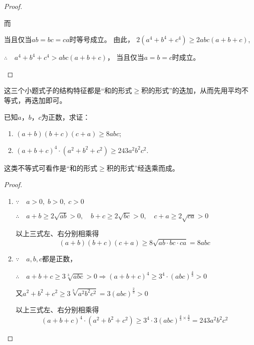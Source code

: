 \begin{proof}
\begin{enumerate}[(1)]
而
\begin{flushleft}
    \end{flushleft}
当且仅当$ab=bc=ca$时等号成立。
由此，
$2(a^4+b^4+c^4)\ge 2abc(a+b+c)$,

$\therefore\quad a^4+b^4+c^4>abc(a+b+c)$，
当且仅当$a=b=c$时成立。
\end{enumerate}

\end{proof}

\begin{rmk}
    这三个小题式子的结构特征都是“和的形式$\ge $积的形式”的迭加，从而先用平均不等式，再迭加即可。
\end{rmk}

\begin{example}
    已知$a$，$b$，$c$为正数，求证：
\begin{enumerate}[(1)]
    \item $(a+b)(b+c)(c+a)\ge 8abc$;
    \item $(a+b+c)^4\cdot (a^2+b^2+c^2)\ge 243a^2b^2c^2$.
\end{enumerate}
\end{example}

\begin{analyze}
    这类不等式可看作是“和的形式$\ge $积的形式”经迭乘而成。
\end{analyze}

\begin{proof}
\begin{enumerate}[(1)]
    \item $\because\quad a>0,\; b>0,\; c>0$

$\therefore\quad a+b\ge 2\sqrt{ab}>0,\quad b+c\ge 2\sqrt{bc}>0,\quad c+a\ge 2\sqrt{ca}>0$

以上三式左、右分别相乘得
\[(a+b)(b+c)(c+a)\ge 8\sqrt{ab\cdot bc\cdot ca}=8abc\]
\item $\because\quad a,b,c$都是正数，

$\therefore\quad a+b+c\ge 3\sqrt[3]{abc}>0\Longrightarrow (a+b+c)^4\ge 3^4\cdot (abc)^{\tfrac{4}{3}}>0$

又$a^2+b^2+c^2\ge 3\sqrt[3]{a^2b^2c^2}=3(abc)^{\tfrac{2}{3}}>0$

以上三式左、右分别相乘得
\[(a+b+c)^4\cdot (a^2+b^2+c^2)\ge 3^4\cdot 3(abc)^{\tfrac{4}{3}\times \tfrac{3}{2}}=243a^2b^2c^2\]
\end{enumerate}
\end{proof}

